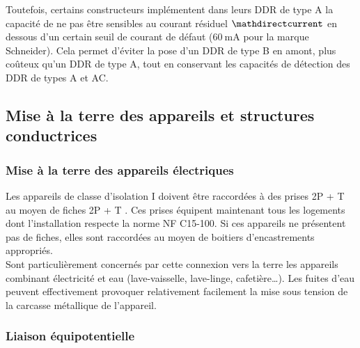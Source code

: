 Toutefois, certains constructeurs implémentent dans leurs DDR de type A la capacité de ne pas être sensibles au courant résiduel $\mathdirectcurrent$ en dessous d'un certain seuil de courant de défaut ($\SI{60}{\milli\ampere}$ pour la marque Schneider\supercite{Schneider:coordinationDDR}). Cela permet d'éviter la pose d'un DDR de type B en amont, plus coûteux qu'un DDR de type A, tout en conservant les capacités de détection des DDR de types A et AC.

\subsection{Mise à la terre des appareils et structures conductrices}

\subsubsection{Mise à la terre des appareils électriques}

Les appareils de classe d'isolation I doivent être raccordées à des prises 2P + T  au moyen de fiches 2P + T . Ces prises équipent maintenant tous les logements dont l'installation respecte la norme NF C15-100. Si ces appareils ne présentent pas de fiches, elles sont raccordées au moyen de boitiers d'encastrements appropriés.\\
Sont particulièrement concernés par cette connexion vers la terre les appareils combinant électricité et eau (lave-vaisselle, lave-linge, cafetière\ldots {}). Les fuites d'eau peuvent effectivement  provoquer relativement facilement la mise sous tension de la carcasse métallique de l'appareil.

\subsubsection{Liaison équipotentielle}

